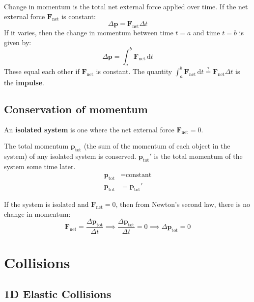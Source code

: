 \documentclass{article}
\newcommand{\definition}[1]{\begin{tcolorbox}[colback=red!5!white,colframe=red!75!black,parbox=false] #1 \end{tcolorbox}}
\newcommand{\theorem}[2]{\begin{tcolorbox}[title={#1},colback=blue!5!white,colframe=blue!75!black,parbox=false] #2 \end{tcolorbox}}
\begin{document}
\definition{Change in momentum is the total net external force applied over time. If the net external force $\mathbf{F}_\text{net}$ is constant:
\begin{equation*}
	\Delta \mathbf{p}=\mathbf{F}_\text{net}\Delta t
\end{equation*}
If it varies, then the change in momentum between time $t=a$ and time $t=b$ is given by:
\begin{equation*}
	\Delta \mathbf{p}=\int_{a}^{b}\mathbf{F}_\text{net}\,\mathrm{d}t
\end{equation*}
These equal each other if $\mathbf{F}_\text{net}$ is constant. The quantity $\int_{a}^{b}\mathbf{F}_\text{net}\,\mathrm{d}t \stackrel{?}{=} \mathbf{F}_\text{net}\Delta t$ is the \textbf{impulse}.}

\subsection{Conservation of momentum}

\definition{An \textbf{isolated system} is one where the net external force $\mathbf{F}_\text{net}=0$.}

\theorem{Conservation of momentum}{The total momentum $\mathbf{p}_\text{tot}$ (the sum of the momentum of each object in the system) of any isolated system is conserved. $\mathbf{p}_\text{tot}'$ is the total momentum of the system some time later.
\begin{align*}
	\mathbf{p}_\text{tot}&=\text{constant} \\
	\mathbf{p}_\text{tot}&=\mathbf{p}_\text{tot}'
\end{align*}}

If the system is isolated and $\mathbf{F}_\text{net}=0$, then from Newton's second law, there is no change in momentum:
\begin{equation*}
	\mathbf{F}_\text{net}=\frac{\Delta \mathbf{p}_\text{tot}}{\Delta t}
	\implies \frac{\Delta \mathbf{p}_\text{tot}}{\Delta t}=0
	\implies \Delta \mathbf{p}_\text{tot}=0
\end{equation*}


\section{Collisions}

\subsection{1D Elastic Collisions}
\end{document}
